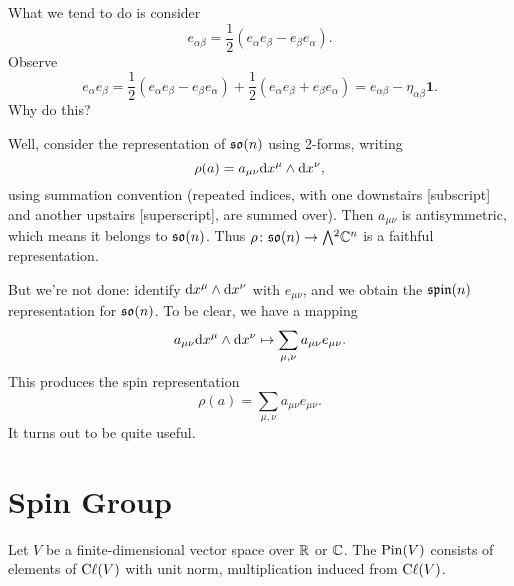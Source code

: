 \M
What we tend to do is consider
\begin{equation}
e_{\alpha\beta} = \frac{1}{2}(e_{\alpha}e_{\beta} - e_{\beta}e_{\alpha}).
\end{equation}
Observe
\begin{equation}
e_{\alpha}e_{\beta} = \frac{1}{2}(e_{\alpha}e_{\beta} -
e_{\beta}e_{\alpha}) + \frac{1}{2}(e_{\alpha}e_{\beta} + e_{\beta}e_{\alpha})
= e_{\alpha\beta} - \eta_{\alpha\beta}\mathbf{1}.
\end{equation}
Why do this?

Well, consider the representation of $\mathfrak{so}(n)$ using 2-forms, writing
\begin{equation}
\rho(a) = a_{\mu\nu}\mathrm{d} x^{\mu}\wedge\mathrm{d} x^{\nu},
\end{equation}
using summation convention (repeated indices, with one downstairs
[subscript] and another upstairs [superscript], are summed over). Then
$a_{\mu\nu}$ is antisymmetric, which means it belongs to $\mathfrak{so}(n)$. Thus
$\rho\colon\so(n)\to\Exterior^{2}\CC^{n}$ is a faithful representation.

But we're not done: identify $\mathrm{d} x^{\mu}\wedge\mathrm{d} x^{\nu}$ with
$e_{\mu\nu}$, and we obtain the $\operatorname{\mathfrak{spin}}(n)$ representation for $\mathfrak{so}(n)$.
To be clear, we have a mapping
\begin{equation}
a_{\mu\nu}\mathrm{d} x^{\mu}\wedge\mathrm{d} x^{\nu}\mapsto\sum_{\mu,\nu}a_{\mu\nu}e_{\mu\nu}.
\end{equation}
This produces the spin representation
\begin{equation}
\rho(a) = \sum_{\mu,\nu}a_{\mu\nu}e_{\mu\nu}.
\end{equation}
It turns out to be quite useful.

\section{Spin Group}

\begin{definition}
Let $V$ be a finite-dimensional vector space over $\mathbb{R}$ or $\mathbb{C}$.
The  $\operatorname{Pin}(V)$ consists of elements of $\mathrm{C}\ell(V)$
with unit norm, multiplication induced from $\mathrm{C}\ell(V)$.
\end{definition}

